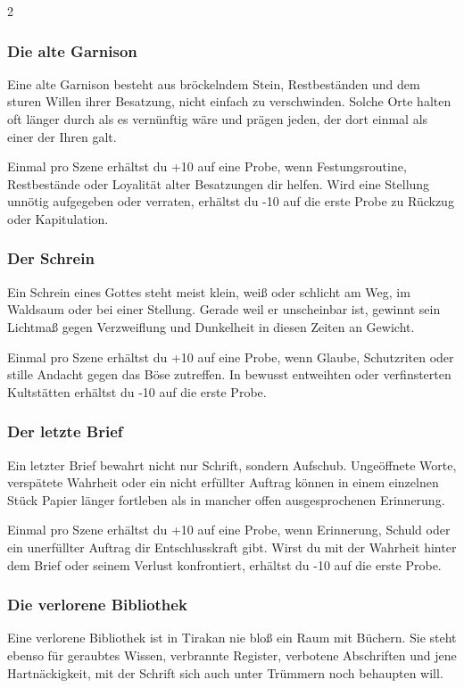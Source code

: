 {\begin{multicols*}{2}
        \subsubsection*{Die alte Garnison}
        Eine alte Garnison besteht aus bröckelndem Stein, Restbeständen und dem sturen Willen ihrer Besatzung, nicht einfach zu verschwinden. Solche Orte halten oft länger durch als es vernünftig wäre und prägen jeden, der dort einmal als einer der Ihren galt.

        \bindungspielwertebox
        {Einmal pro Szene erhältst du +10 auf eine Probe, wenn Festungsroutine, Restbestände oder Loyalität alter Besatzungen dir helfen.}
        {Wird eine Stellung unnötig aufgegeben oder verraten, erhältst du -10 auf die erste Probe zu Rückzug oder Kapitulation.}

        \subsubsection*{Der Schrein}
        Ein Schrein eines Gottes steht meist klein, weiß oder schlicht am Weg, im Waldsaum oder bei einer Stellung. Gerade weil er unscheinbar ist, gewinnt sein Lichtmaß gegen Verzweiflung und Dunkelheit in diesen Zeiten an Gewicht.

        \bindungspielwertebox
        {Einmal pro Szene erhältst du +10 auf eine Probe, wenn Glaube, Schutzriten oder stille Andacht gegen das Böse zutreffen.}
        {In bewusst entweihten oder verfinsterten Kultstätten erhältst du -10 auf die erste Probe.}

        \subsubsection*{Der letzte Brief}
        Ein letzter Brief bewahrt nicht nur Schrift, sondern Aufschub. Ungeöffnete Worte, verspätete Wahrheit oder ein nicht erfüllter Auftrag können in einem einzelnen Stück Papier länger fortleben als in mancher offen ausgesprochenen Erinnerung.

        \bindungspielwertebox
        {Einmal pro Szene erhältst du +10 auf eine Probe, wenn Erinnerung, Schuld oder ein unerfüllter Auftrag dir Entschlusskraft gibt.}
        {Wirst du mit der Wahrheit hinter dem Brief oder seinem Verlust konfrontiert, erhältst du -10 auf die erste Probe.}

        \subsubsection*{Die verlorene Bibliothek}
        Eine verlorene Bibliothek ist in Tirakan nie bloß ein Raum mit Büchern. Sie steht ebenso für geraubtes Wissen, verbrannte Register, verbotene Abschriften und jene Hartnäckigkeit, mit der Schrift sich auch unter Trümmern noch behaupten will.


\end{multicols*}}

